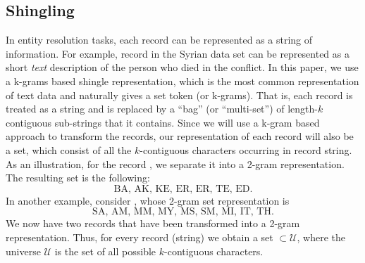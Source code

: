 \documentclass[aoas]{imsart}
\begin{document}
\subsection{Shingling}


In entity resolution tasks, each record can be represented as a string of information. For example, record in the Syrian data set can be represented as a short \textit{text} description of the person who died in the conflict. In this paper, we use a k-grams based shingle representation, which is the most common representation of text data and naturally gives a set token (or k-grams).
That is, each record is treated as a string and is replaced by a ``bag'' (or ``multi-set'') of length-$k$ contiguous sub-strings that it contains. Since we will use a k-gram based approach to transform the records, our representation of each record will also be a set, which consist of all the $k$-contiguous characters occurring in record string. As an illustration, for the record , we separate it into a 2-gram representation. The resulting set is the following: $$\text{BA, AK, KE, ER, ER, TE, ED}.$$ In another example, consider , whose 2-gram set representation is $$\text{SA, AM, MM, MY, MS, SM, MI, IT, TH}.$$ We now have two records that have been transformed into a 2-gram representation. Thus, for every record (string) we obtain a set $\subset \mathcal{U}$, where the universe $\mathcal{U}$ is the set of all possible $k$-contiguous characters.
\end{document}
